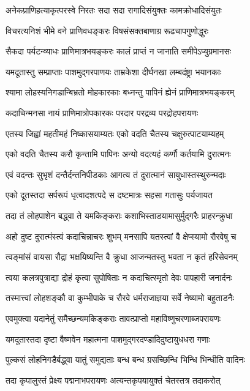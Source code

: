 \twolineshloka
{अनेकप्राणिहत्याकृत्परस्वे निरतः सदा}
{सदा रागादिसंयुक्तः कामक्रोधादिसंयुतः}%

\twolineshloka
{विचरत्यनिशं भीमे वने प्राणिवधङ्करः}
{विषसंसक्तबाणाग्र रूढचापगुणोद्धुरः}%

\twolineshloka
{सैकदा पर्यटन्व्याधः प्राणिमात्रभयङ्करः}
{कालं प्राप्तं न जानाति समीपेऽप्युग्रमानसः}%

\twolineshloka
{यमदूतास्तु सम्प्राप्ताः पाशमुद्गरपाणयः}
{ताम्रकेशा दीर्घनखा लम्बदंष्ट्रा भयानकाः}%

\twolineshloka
{श्यामा लोहस्यनिगडान्बिभ्रतो मोहकारकाः}
{बध्नन्तु पापिनं ह्येनं प्राणिमात्रभयङ्करम्}%

\twolineshloka
{कदाचिन्मनसा नायं प्राणिमात्रोपकारकः}
{परदार परद्रव्य परद्रोहपरायणः}%

\twolineshloka
{एतस्य जिह्वां महतीमहं निष्कासयाम्यतः}
{एको वदति चैतस्य चक्षुरुत्पाटयाम्यहम्}%

\twolineshloka
{एको वदति चैतस्य करौ कृन्तामि पापिनः}
{अन्यो वदत्यहं कर्णौ कर्तयामि दुरात्मनः}%

\twolineshloka
{एवं वदन्तः सुभृशं दन्तैर्दन्तनिपीडकाः}
{आगत्य तं दुरात्मानं सायुधास्तस्थुरुन्मदाः}%

\twolineshloka
{एको दूतस्तदा सर्परूपं धृत्वादशत्पदे}
{स दष्टमात्रः सहसा गतासुः पर्यजायत}%

\twolineshloka
{तदा तं लोहपाशेन बद्ध्वा ते यमकिङ्कराः}
{कशाभिस्ताडयामासुर्मुद्गरैः प्राहरन्क्रुधा}%

\twolineshloka
{अहो दुष्ट दुरात्मंस्त्वं कदाचिन्नाचरः शुभम्}
{मनसापि यतस्त्वां वै क्षेप्स्यामो रौरवेषु च}%

\twolineshloka
{त्वङ्मांसं वायसा रौद्रा भक्षयिष्यन्ति वै क्रुधा}
{आजन्मतस्तु भवता न कृतं हरिसेवनम्}%

\twolineshloka
{त्वया कलत्रपुत्राद्या द्रोहं कृत्वा सुपोषिताः}
{न कदाचित्स्मृतो देवः पापहारी जनार्दनः}%

\twolineshloka
{तस्मात्त्वां लोहशङ्कौ वा कुम्भीपाके च रौरवे}
{धर्मराजाज्ञया सर्वे नेष्यामो बहुताडनैः}%

\twolineshloka
{एवमुक्त्वा यदानेतुं समैच्छन्यमकिङ्कराः}
{तावत्प्राप्तो महाविष्णुचरणाब्जपरायणः}%

\twolineshloka
{यमदूतास्तदा दृष्टा वैष्णवेन महात्मना}
{पाशमुद्गरदण्डादिदुष्टायुधधरा गणाः}%

\twolineshloka
{पुल्कसं लोहनिगडैर्बद्ध्वा यातुं समुद्यताः}
{बन्ध बन्ध ग्रसच्छिन्धि भिन्धि भिन्धीति वादिनः}%

\twolineshloka
{तदा कृपालुस्तं प्रेक्ष्य पद्मनाभपरायणः}
{अत्यन्तकृपयायुक्तं चेतस्तत्र तदाकरोत्}%

